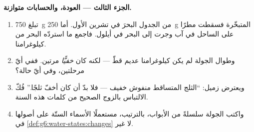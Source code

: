 \begin{problem}
\medskip\noindent\textbf{الجزء الثالث --- العودة، والحسابات
متوازنة.}
\begin{enumerate}[resume]
  \item تبلغ \qty{750}{g} من الجدول البحرَ في تشرين الأول. أما
        \qty{250}{g} المتبخّرة فسقطت مطرًا على الساحل في آب
        وجرت إلى البحر في أيلول. فاجمع ما استردّه البحر من
        كيلوغرامنا.
  \item وطوال الجولة لم يكن كيلوغرامنا عديم  قطّ --- لكنه
        كان \emph{خفيًّا} مرتين. ففي أيّ مرحلتين، وفي أيّ
        حالة؟
  \item ويعترض زميل: ``الثلج المتساقط منفوش خفيف --- فلا بدّ أن
         كان أخفّ ثلجًا.'' فُكّ الالتباس بالزوج
        الصحيح من كلمات هذه السنة.
  \item واكتب الجولة سلسلةً من الأبواب، بالترتيب، مستعملًا
        الأسماء الستّة على أصولها في
        \cref{def:g6:water-states:changes} لا غير.
\end{enumerate}
\end{problem}
